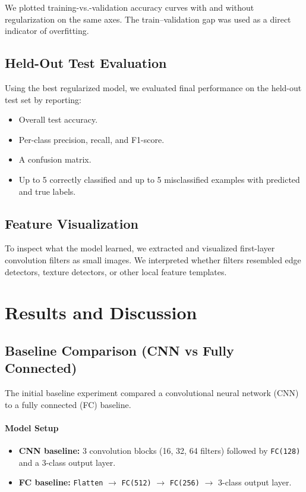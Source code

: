 \documentclass[10pt,twocolumn]{article}
\begin{document}
We plotted training-vs.-validation accuracy curves with and without regularization on the same axes. The train--validation gap was used as a direct indicator of overfitting.

\subsection{Held-Out Test Evaluation}
Using the best regularized model, we evaluated final performance on the held-out test set by reporting:

\begin{itemize}
	\item Overall test accuracy.
	\item Per-class precision, recall, and F1-score.
	\item A confusion matrix.
	\item Up to 5 correctly classified and up to 5 misclassified examples with predicted and true labels.
\end{itemize}

\subsection{Feature Visualization}
To inspect what the model learned, we extracted and visualized first-layer convolution filters as small images. We interpreted whether filters resembled edge detectors, texture detectors, or other local feature templates.

\section{Results and Discussion}
\label{sec:results}

\subsection{Baseline Comparison (CNN vs Fully Connected)}

The initial baseline experiment compared a convolutional neural network (CNN) to a fully connected (FC) baseline.

\paragraph{Model Setup}
\begin{itemize}
	\item \textbf{CNN baseline:} 3 convolution blocks (16, 32, 64 filters) followed by \texttt{FC(128)} and a 3-class output layer.
	\item \textbf{FC baseline:} \texttt{Flatten} $\rightarrow$ \texttt{FC(512)} $\rightarrow$ \texttt{FC(256)} $\rightarrow$ 3-class output layer.
\end{itemize}
\end{document}
